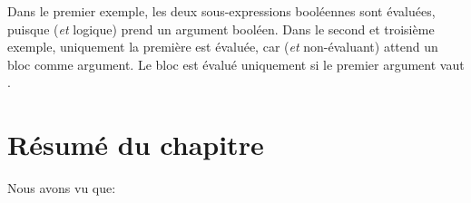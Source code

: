 \documentclass[a4paper,10pt,twoside]{book}
\begin{document}
Dans le premier exemple, les deux sous-expressions booléennes sont
évaluées, puisque  
(\emph{et} logique) 
prend un argument booléen.
Dans le second et troisième exemple, uniquement la première est
évaluée, car  
(\emph{et} non-évaluant) 
attend un bloc comme argument. Le  bloc est évalué uniquement si le premier argument vaut .


\section{Résumé du chapitre}
Nous avons vu que:
\end{document}
